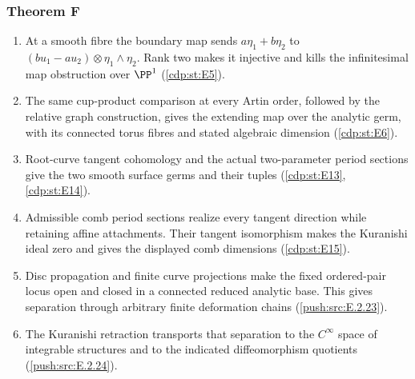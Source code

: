 \subsubsection*{Theorem F}
\begin{enumerate}[label=\arabic*.,leftmargin=*]
\item\hypertarget{step-II-F-1}{} At a smooth fibre the boundary
map sends $a\eta_1+b\eta_2$ to
$(bu_1-au_2)\otimes\eta_1\wedge\eta_2$. Rank two makes it
injective and kills the infinitesimal map obstruction over
$\PP^1$ (\hyperref[cdp:st:E5]{\ref*{cdp:st:E5}}).
\item\hypertarget{step-II-F-2}{} The same cup-product comparison
at every Artin order, followed by the relative graph construction,
gives the extending map over the analytic germ, with its
connected torus fibres and stated algebraic dimension
(\hyperref[cdp:st:E6]{\ref*{cdp:st:E6}}).
\item\hypertarget{step-II-F-3}{} Root-curve tangent cohomology
and the actual two-parameter period sections give the two smooth
surface germs and their tuples
(\hyperref[cdp:st:E13]{\ref*{cdp:st:E13}},
\hyperref[cdp:st:E14]{\ref*{cdp:st:E14}}).
\item\hypertarget{step-II-F-4}{} Admissible comb period sections
realize every tangent direction while retaining affine attachments.
Their tangent isomorphism makes the Kuranishi ideal zero and gives
the displayed comb dimensions
(\hyperref[cdp:st:E15]{\ref*{cdp:st:E15}}).
\item\hypertarget{step-II-F-5}{} Disc propagation and finite
curve projections make the fixed ordered-pair locus open and
closed in a connected reduced analytic base. This gives
separation through arbitrary finite deformation chains
(\hyperref[push:src:E.2.23]{\ref*{push:src:E.2.23}}).
\item\hypertarget{step-II-F-6}{} The Kuranishi retraction transports
that separation to the $C^\infty$ space of integrable structures
and to the indicated diffeomorphism quotients
(\hyperref[push:src:E.2.24]{\ref*{push:src:E.2.24}}).
\end{enumerate}

\hypertarget{outline-II-G}{}

